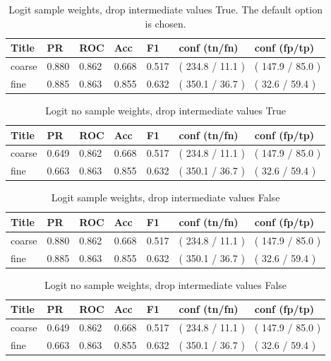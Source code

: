 \documentclass[ms]{nuthesis}
\begin{document}
\FloatBarrier
\begin{table}[H]
\centering
\caption{Logit sample weights, drop intermediate values True. The default option is chosen.}
\label{tab:LogRegDefSWDropFalse}
\begin{tabular}{|l||l||l||l||l||l||l|}\toprule
Title & PR & ROC & Acc & F1 & conf (tn/fn) & conf (fp/tp) \\ \midrule
coarse & 0.880 & 0.862 & 0.668 & 0.517 & ( 234.8 / 11.1 ) & ( 147.9 / 85.0 ) \\
fine & 0.885 & 0.863 & 0.855 & 0.632 & ( 350.1 / 36.7 ) & ( 32.6 / 59.4 ) \\ \bottomrule
\end{tabular}
\end{table}
\FloatBarrier


\FloatBarrier
\begin{table}[h]
\centering
\caption{Logit no sample weights, drop intermediate values True}
\label{tab:LogReg-NoSW}
\begin{tabular}{|l||l||l||l||l||l||l|}\toprule
Title & PR & ROC & Acc & F1 & conf (tn/fn) & conf (fp/tp) \\ \midrule
coarse & 0.649 & 0.862 & 0.668 & 0.517 & ( 234.8 / 11.1 ) & ( 147.9 / 85.0 ) \\
fine & 0.663 & 0.863 & 0.855 & 0.632 & ( 350.1 / 36.7 ) & ( 32.6 / 59.4 ) \\ \bottomrule
\end{tabular}
\end{table}
\FloatBarrier

\FloatBarrier
\begin{table}[h]
\centering
\caption{Logit sample weights, drop intermediate values False}
\label{tab:LogReg-DropFalse}
\begin{tabular}{|l||l||l||l||l||l||l|}\toprule
Title & PR & ROC & Acc & F1 & conf (tn/fn) & conf (fp/tp) \\ \midrule
coarse & 0.880 & 0.862 & 0.668 & 0.517 & ( 234.8 / 11.1 ) & ( 147.9 / 85.0 ) \\
fine & 0.885 & 0.863 & 0.855 & 0.632 & ( 350.1 / 36.7 ) & ( 32.6 / 59.4 ) \\ \bottomrule
\end{tabular}
\end{table}
\FloatBarrier

\FloatBarrier
\begin{table}[h]
\centering
\caption{Logit no sample weights, drop intermediate values False}
\label{tab:LogReg-NoSW-DropFalse}
\begin{tabular}{|l||l||l||l||l||l||l|}\toprule
Title & PR & ROC & Acc & F1 & conf (tn/fn) & conf (fp/tp) \\ \midrule
coarse & 0.649 & 0.862 & 0.668 & 0.517 & ( 234.8 / 11.1 ) & ( 147.9 / 85.0 ) \\
fine & 0.663 & 0.863 & 0.855 & 0.632 & ( 350.1 / 36.7 ) & ( 32.6 / 59.4 ) \\ \bottomrule
\end{tabular}
\end{table}
\FloatBarrier
\end{document}
